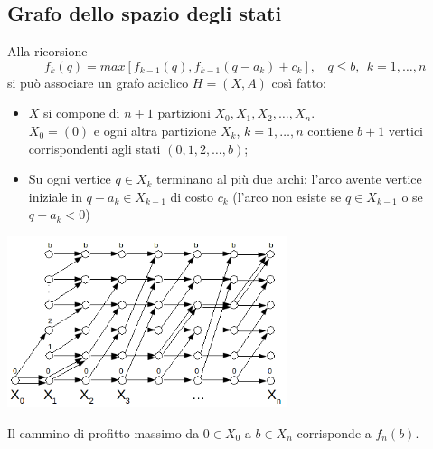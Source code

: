 \subsection{Grafo dello spazio degli stati}
Alla ricorsione
\begin{equation*}
	f_{k}(q)=max[f_{k-1}(q),f_{k-1}(q-a_{k})+c_{k}],\ \ \ \ q\le b,\ \ k=1,\dots,n
\end{equation*}
si può associare un grafo aciclico $H=(X,A)$ così fatto:
\begin{itemize}
	\item $X$ si compone di $n+1$ partizioni $X_{0},X_{1},X_{2},\dots,X_{n}$.\\
	$X_{0}=(0)$ e ogni altra partizione $X_{k}$, $k=1,\dots,n$ contiene $b+1$ vertici corrispondenti agli stati $(0,1,2,\dots,b)$;
	\item Su ogni vertice $q\in X_{k}$ terminano al più due archi: l'arco avente vertice iniziale in $q-a_{k}\in X_{k-1}$ di costo $c_{k}$ (l'arco non esiste se $q\in X_{k-1}$ o se $q-a_{k}<0$)
\end{itemize}
\centerline{\includegraphics[height=5cm]{images/graph39.png}}
Il cammino di profitto massimo da $0\in X_{0}$ a $b\in X_{n}$ corrisponde a $f_{n}(b)$.

